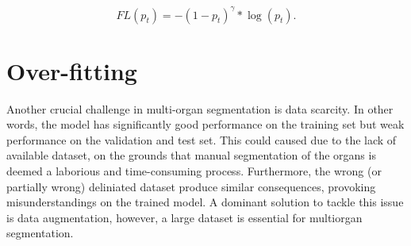 \begin{equation}
        FL(p_{t})= -(1-p_{t})^\gamma*\log (p_{t}).
\end{equation}






\section{Over-fitting}
Another crucial challenge in multi-organ segmentation is data scarcity. In other words, 
the model has significantly good performance on the training set but weak performance 
on the validation and test set. This could caused due to the lack of available dataset, on the grounds 
that manual segmentation of the organs is deemed a laborious and time-consuming process. 
Furthermore, the wrong (or partially wrong) deliniated dataset produce similar consequences, 
provoking misunderstandings on the trained model. A dominant solution to tackle this issue is data augmentation, however, 
a large dataset is essential for multiorgan segmentation.